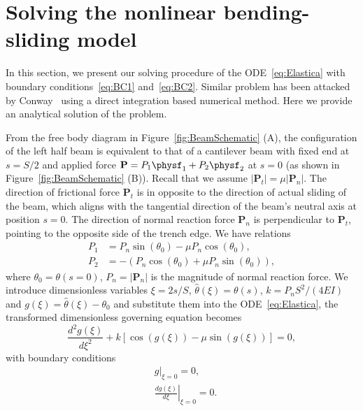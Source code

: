 \section{Solving the nonlinear bending-sliding model}
\label{sec:SolvingDetials}

In this section, we present our solving procedure of the ODE~\eqref{eq:Elastica} with boundary conditions~\eqref{eq:BC1} and~\eqref{eq:BC2}.
Similar problem has been attacked by Conway~\cite{Conway1947XCIV.} using a direct integration based numerical method.
Here we provide an analytical solution of the problem.

From the free body diagram in Figure~\ref{fig:BeamSchematic} (\textsf{A}), the configuration of the left half beam is equivalent to that of a cantilever beam with fixed end at $s = S/2$ and applied force $\mathbf{P} = P_1 \physf_1 + P_2 \physf_2 $ at $s = 0$ (as shown in Figure~\ref{fig:BeamSchematic} (\textsf{B})). Recall that we assume $|\mathbf{P}_t| = \mu |\mathbf{P}_n|$.
The direction of frictional force $\mathbf{P}_t$ is in opposite to the direction of actual sliding of the beam, which aligns with the tangential direction of the beam's neutral axis at position $s = 0$.
The direction of normal reaction force $\mathbf{P}_n$ is perpendicular to $\mathbf{P}_t$, pointing to the opposite side of the trench edge. We have relations
\begin{align}
    \label{eq:P1}
    P_1 &= P_n \sin(\theta_0) - \mu P_n \cos(\theta_0), \\
    \label{eq:P2}
    P_2 &= - \left (P_n \cos(\theta_0) + \mu P_n \sin(\theta_0)\right),
\end{align}
where $\theta_0 = \theta(s = 0)$, $P_n = |\mathbf{P}_n|$ is the magnitude of normal reaction force. We introduce dimensionless variables $\xi = 2s/S$, $\hat{\theta}(\xi) = \theta(s)$, $k = P_n S^2/(4 E I)$ and $g(\xi) = \hat{\theta}(\xi) - \theta_0$ and substitute them into the ODE~\eqref{eq:Elastica}, the transformed dimensionless governing equation becomes
\begin{equation}
    \label{eq:NonDimElastica}
    \frac{d^2 g(\xi)}{d \xi^2} + k\left[\cos(g(\xi)) - \mu  \sin(g(\xi)) \right] = 0,
\end{equation}
with boundary conditions
\begin{align}
    \label{eq:NonDimBC1}
    & \left. g \right|_{\xi = 0} = 0, \\
    \label{eq:NonDimBC2}
    & \left. \frac{dg (\xi)}{d\xi} \right|_{\xi = 0} = 0.
\end{align}

